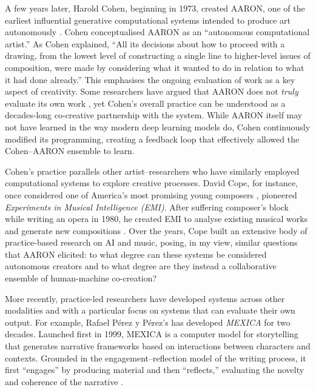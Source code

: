 A few years later, Harold Cohen, beginning in 1973, created AARON, one of the earliest influential generative computational systems intended to produce art autonomously \cite{Cohen1995-nt}. Cohen conceptualised AARON as an “autonomous computational artist.” As Cohen explained, “All its decisions about how to proceed with a drawing, from the lowest level of constructing a single line to higher-level issues of composition, were made by considering what it wanted to do in relation to what it had done already.” This emphasises the ongoing evaluation of work as a key aspect of creativity. Some researchers have argued that AARON does not \emph{truly} evaluate its own work \cite{Colton2008-fh, Hofstadter1995-sn}, yet Cohen's overall practice can be understood as a decades-long co-creative partnership with the system. While AARON itself may not have learned in the way modern deep learning models do, Cohen continuously modified its programming, creating a feedback loop that effectively allowed the Cohen–AARON ensemble to learn.

Cohen’s practice parallels other artist–researchers who have similarly employed computational systems to explore creative processes. David Cope, for instance, once considered one of America’s most promising young composers \cite{Adams2010-dk}, pioneered \emph{Experiments in Musical Intelligence (EMI)}. After suffering composer’s block while writing an opera in 1980, he created EMI to analyse existing musical works and generate new compositions \cite{Cope1992-pq, Cope2000-cq, Cope1992-rl}. Over the years, Cope built an extensive body of practice-based research on AI and music, posing, in my view, similar questions that AARON elicited: to what degree can these systems be considered autonomous creators and to what degree are they instead a collaborative ensemble of human-machine co-creation? 

More recently, practice-led researchers have developed systems across other modalities and with a particular focus on systems that can evaluate their own output. For example, Rafael Pérez y Pérez’s has developed \emph{MEXICA} for two decades. Launched first in 1999, MEXICA is a computer model for storytelling that generates narrative frameworks based on interactions between characters and contexts. Grounded in the engagement–reflection model of the writing process, it first “engages” by producing material and then “reflects,” evaluating the novelty and coherence of the narrative \cite{PErez2001-vz, Perez-y-Perez2004-cm, Montfort2023-pb, Perez-y-Perez2023-ws, Sharples2022-hq}.

